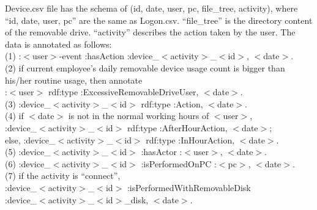 Device.csv file has the schema of (id, date, user, pc, file\_tree, activity), where ``id, date, user, pc'' are the same as Logon.csv.
``file\_tree'' is the directory content of the removable drive.
``activity'' describes the action taken by the user. 
The data is annotated as follows: \\
(1) :$<$user$>$-event :hasAction :device\_$<$activity$>$\_$<$id$>$, $<$date$>$. \\
(2) if current employee's daily removable device usage count is bigger than his/her routine usage, then annotate \\
:$<$user$>$ rdf:type :ExcessiveRemovableDriveUser, $<$date$>$. \\
(3) :device\_$<$activity$>$\_$<$id$>$ rdf:type :Action, $<$date$>$. \\
(4) if $<$date$>$ is not in the normal working hours of $<$user$>$, \\
:device\_$<$activity$>$\_$<$id$>$ rdf:type :AfterHourAction, $<$date$>$; \\
else, :device\_$<$activity$>$\_$<$id$>$ rdf:type :InHourAction, $<$date$>$. \\
(5) :device\_$<$activity$>$\_$<$id$>$ :hasActor :$<$user$>$, $<$date$>$. \\
(6) :device\_$<$activity$>$\_$<$id$>$ :isPerformedOnPC :$<$pc$>$, $<$date$>$. \\
(7) if the activity is ``connect'', \\
:device\_$<$activity$>$\_$<$id$>$ :isPerformedWithRemovableDisk \\
:device\_$<$activity$>$\_$<$id$>$\_disk, $<$date$>$. 

